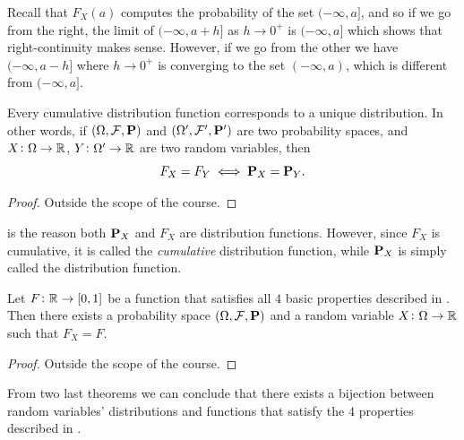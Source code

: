 \documentclass[11pt,a4paper]{article}
\begin{document}
\begin{remark}
  Recall that $F_X(a)$ computes the probability of the set $(-\infty,a]$,
  and so if we go from the right, the limit of $(-\infty,a+h]$
  as $h \to 0^+$ is $(-\infty,a]$ which shows that right-continuity
  makes sense.
  However, if we go from the other we have $(-\infty,a-h]$ where $h \to 0^+$
  is converging to the set $(-\infty,a)$, which is different from
  $(-\infty,a]$.
\end{remark}

\begin{theorem}\label{thm:FcharacterizesP}
  Every cumulative distribution function corresponds to a unique distribution. 
  In other words,
  if $(\Omega, \mathcal F, \mathbf{P})$ and $(\Omega', \mathcal F', \mathbf{P}')$
  are two probability spaces, and $X \colon \Omega \to \mathbb{R}$, 
  $Y \colon \Omega' \to \mathbb{R}$ are two random variables, then
  \[
    F_X = F_Y \iff \mathbf{P}_X = \mathbf{P}_Y.
  \]
\end{theorem}
\begin{proof}
  Outside the scope of the course.
\end{proof}
\begin{remark}
   is the reason both $\mathbf{P}_X$ and $F_X$
  are distribution functions.
  However, since $F_X$ is cumulative, it is called the \textit{cumulative}
  distribution function, while $\mathbf{P}_X$ is simply called the distribution
  function.
\end{remark}
\begin{theorem}\label{thm:FcharacterizesPtwo}
  Let $F \colon \mathbb{R} \to [0,1]$ be a function that satisfies all $4$ basic
  properties described in .
  Then there exists a probability space 
  $(\Omega, \mathcal F, \mathbf{P})$ and a random variable 
  $X \colon \Omega \to \mathbb{R}$ such that $F_X = F$.
\end{theorem}
\begin{proof}
  Outside the scope of the course.
\end{proof}

\begin{remark}
  From two last theorems
  we can conclude that there exists a bijection between random variables'
  distributions and functions that satisfy the $4$ properties described
  in .
\end{remark}
\end{document}

